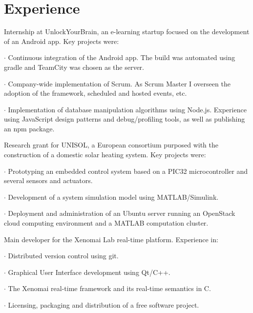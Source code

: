 \section*{Experience}

{
Internship at UnlockYourBrain, an e-learning startup focused on the development
of an Android app. Key projects were:

 $\cdot$  Continuous integration of the Android app. The build was automated
using gradle and TeamCity was chosen as the server.

 $\cdot$  Company-wide implementation of Scrum. As Scrum Master I overseen the
adoption of the framework, scheduled and hosted events, etc.

 $\cdot$  Implementation of database manipulation algorithms using Node.js.
Experience using JavaScript design patterns and debug/profiling tools, as well
as publishing an npm package.
}

{
Research grant for UNISOL, a European consortium purposed with the construction
of a domestic solar heating system. Key projects were:

 $\cdot$  Prototyping an embedded control system based on a PIC32 microcontroller and
several sensors and actuators.

 $\cdot$  Development of a system simulation model using MATLAB/Simulink.

 $\cdot$  Deployment and administration of an Ubuntu server running an
OpenStack cloud computing environment and a MATLAB computation cluster.
}

\vspace{\baselineskip}
{
Main developer for the Xenomai Lab real-time platform. Experience in:

 $\cdot$ Distributed version control using git.

 $\cdot$ Graphical User Interface development using Qt/C++.

 $\cdot$ The Xenomai real-time framework and its real-time semantics in C.

 $\cdot$ Licensing, packaging and distribution of a free software project.

}

